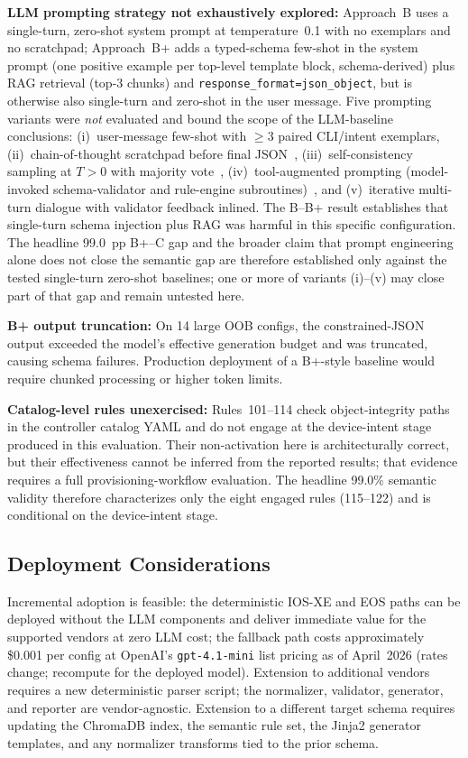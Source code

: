 \documentclass[conference]{IEEEtran}
\begin{document}
\textbf{LLM prompting strategy not exhaustively explored:} Approach~B uses a single-turn, zero-shot system prompt at temperature~0.1 with no exemplars and no scratchpad; Approach~B+ adds a typed-schema few-shot in the system prompt (one positive example per top-level template block, schema-derived) plus RAG retrieval (top-3 chunks) and \texttt{response\_format=json\_object}, but is otherwise also single-turn and zero-shot in the user message. Five prompting variants were \emph{not} evaluated and bound the scope of the LLM-baseline conclusions: (i)~user-message few-shot with $\geq$3 paired CLI/intent exemplars, (ii)~chain-of-thought scratchpad before final JSON~\cite{wei2022cot}, (iii)~self-consistency sampling at $T>0$ with majority vote~\cite{wang2023selfconsistency}, (iv)~tool-augmented prompting (model-invoked schema-validator and rule-engine subroutines)~\cite{schick2023toolformer}, and (v)~iterative multi-turn dialogue with validator feedback inlined. The B--B+ result establishes that single-turn schema injection plus RAG was harmful in this specific configuration. The headline 99.0~pp B+--C gap and the broader claim that prompt engineering alone does not close the semantic gap are therefore established only against the tested single-turn zero-shot baselines; one or more of variants (i)--(v) may close part of that gap and remain untested here.

\textbf{B+ output truncation:} On 14 large OOB configs, the constrained-JSON output exceeded the model's effective generation budget and was truncated, causing schema failures. Production deployment of a B+-style baseline would require chunked processing or higher token limits.

\textbf{Catalog-level rules unexercised:} Rules~101--114 check object-integrity paths in the controller catalog YAML and do not engage at the device-intent stage produced in this evaluation. Their non-activation here is architecturally correct, but their effectiveness cannot be inferred from the reported results; that evidence requires a full provisioning-workflow evaluation. The headline 99.0\% semantic validity therefore characterizes only the eight engaged rules (115--122) and is conditional on the device-intent stage.

\subsection{Deployment Considerations}

Incremental adoption is feasible: the deterministic IOS-XE and EOS paths can be deployed without the LLM components and deliver immediate value for the supported vendors at zero LLM cost; the fallback path costs approximately \$0.001 per config at OpenAI's \texttt{gpt-4.1-mini} list pricing as of April~2026 (rates change; recompute for the deployed model). Extension to additional vendors requires a new deterministic parser script; the normalizer, validator, generator, and reporter are vendor-agnostic. Extension to a different target schema requires updating the ChromaDB index, the semantic rule set, the Jinja2 generator templates, and any normalizer transforms tied to the prior schema.
\end{document}
